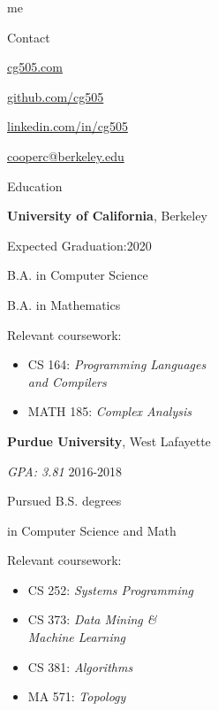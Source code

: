 \begin{minipage}[t]{0.3\textwidth}
  {\Huge me \phantom{my work}}

  \vspace{10pt}

  {\sectionfont Contact}
  \vspace{5pt}
  \begin{adjustwidth}{10pt}{}
    \href{https://cg505.com/}{cg505.com}

    \href{https://github.com/cg505/}{github.com/cg505}

    \href{https://linkedin.com/in/cg505}{linkedin.com/in/cg505}

    \href{mailto:cooperc@berkeley.edu}{cooperc@berkeley.edu}
  \end{adjustwidth}

  \vspace{10pt}

  {\sectionfont Education}

  \vspace{5pt}
  \textbf{University of California}, Berkeley
  \begin{adjustwidth}{10pt}{}
    Expected Graduation:\hfill2020

    B.A. in Computer Science

    B.A. in Mathematics


    Relevant coursework:
    \begin{itemize}[leftmargin=*]
    \item CS 164: \emph{Programming Languages}\\\phantom{CS 164:} \emph{and Compilers}
    \item MATH 185: \emph{Complex Analysis}
    \end{itemize}
  \end{adjustwidth}

  \vspace{5pt}
  \textbf{Purdue University}, West Lafayette
  \begin{adjustwidth}{10pt}{}
    \emph{GPA: 3.81} \hfill2016-2018

    Pursued B.S. degrees

    \enskip in Computer Science and Math


    Relevant coursework:
    \begin{itemize}[leftmargin=*]
    \item CS 252: \emph{Systems Programming}
    \item CS 373: \emph{Data Mining \&}\\\phantom{CS 373:} \emph{Machine Learning}
    \item CS 381: \emph{Algorithms}
    \item MA 571: \emph{Topology}
    \end{itemize}
  \end{adjustwidth}


\end{minipage}
